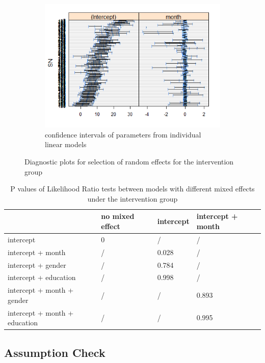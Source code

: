 \begin{figure}[H]
\begin{subfigure}{.33\textwidth}
  \includegraphics[width=1\linewidth]{../../plots/interval_treatment.png}
  \caption{confidence intervals of parameters from individual linear models}
\end{subfigure}
\caption{Diagnostic plots for selection of random effects for the intervention group}
\label{fig:diagnostic.treatment}
\end{figure}

\begin{table}[H]
\centering
\begin{tabular}{|l|l|l|l|}
\hline
& no mixed effect & intercept & intercept + month \\
\hline
intercept & 0 &/ &/ \\
\hline
intercept + month &/ & 0.028 &/ \\
\hline
intercept + gender &/ & 0.784 &/ \\
\hline
intercept + education &/ & 0.998 &/ \\
\hline
intercept + month + gender & /&/ & 0.893 \\
\hline
intercept + month + education & /&/ & 0.995 \\
\hline
\end{tabular}
\caption{P values of Likelihood Ratio tests between models with different mixed effects under the intervention group}
\label{tab:model.comp.treatment.me.lrt}
\end{table}
\subsection{Assumption Check}

